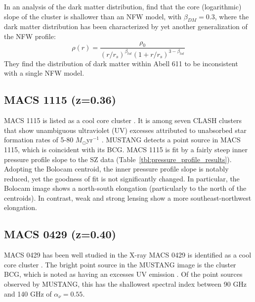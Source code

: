 \documentclass[iop,numberedappendix,apj]{emulateapj}
\begin{document}
In an analysis of the dark matter distribution, \citet{newman2009} find that the core (logarithmic) slope of the
cluster is shallower than an NFW model, with $\beta_{DM} = 0.3$, where the dark matter distribution has been characterized
by yet another generalization of the NFW profile:
\begin{equation}
  \rho(r) = \frac{\rho_0}{(r/r_s)^{\beta_{tot}}(1 + r/r_s)^{3-\beta_{tot}}}
\end{equation}
They find the distribution of dark matter within Abell 611 to be inconsistent with a single NFW model. 


\subsection{MACS 1115 (z=0.36)}
\label{sec:results_m1115}


MACS 1115 is listed as a cool core cluster \citep{sayers2013}. It is among seven CLASH clusters that show
unambiguous ultraviolet (UV) excesses attributed to unabsorbed star formation rates of 5-80 $M_{\odot} $yr$^{-1}$
\citep{donahue2015}. MUSTANG detects a point source in MACS 1115, which is coincident with its BCG. 
MACS 1115 is fit by a fairly steep inner pressure profile slope to the SZ data (Table~\ref{tbl:pressure_profile_results}).
Adopting the Bolocam centroid, the inner pressure profile slope is notably reduced, yet the goodness of fit is
not significantly changed. In particular, the Bolocam image shows a north-south elongation (particularly to the
north of the centroids). In contrast, weak and strong lensing \citep{zitrin2015} show a more southeast-northwest
elongation.


\subsection{MACS 0429 (z=0.40)}
\label{sec:results_m0429}


MACS 0429 has been well studied in the X-ray \citep{schmidt2007,comerford2007,maughan2008,allen2008,mann2012}
MACS 0429 is identified as a cool core cluster \citep[cf.][]{mann2012,sayers2013}. The bright point source in 
the MUSTANG image is the cluster BCG, which is noted as having an excesses UV emission \citep{donahue2015}.
Of the point sources observed by MUSTANG, this has the shallowest spectral index between 90 GHz and 140 GHz
of $\alpha_{\nu} = 0.55$.
\end{document}
